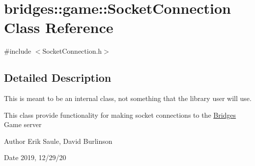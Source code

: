 \hypertarget{classbridges_1_1game_1_1_socket_connection}{}\section{bridges\+:\+:game\+:\+:Socket\+Connection Class Reference}
\label{classbridges_1_1game_1_1_socket_connection}


{\ttfamily \#include $<$Socket\+Connection.\+h$>$}



\subsection{Detailed Description}
This is meant to be an internal class, not something that the library user will use. 

This class provide functionality for making socket connections to the \hyperlink{classbridges_1_1_bridges}{Bridges} Game server

\begin{DoxyAuthor}{Author}
Erik Saule, David Burlinson 
\end{DoxyAuthor}
\begin{DoxyDate}{Date}
2019, 12/29/20 
\end{DoxyDate}
